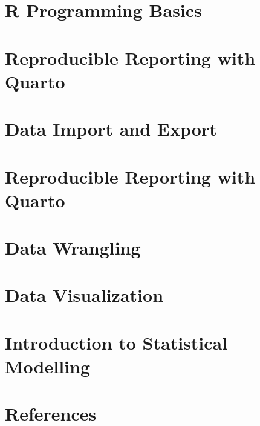 \documentclass[
  letterpaper,
  DIV=11,
  numbers=noendperiod]{scrreprt}
\newlength{\cslhangindent}
\newenvironment{CSLReferences}[2] %
 {\begin{list}{}{%
  \setlength{\itemindent}{0pt}
  \setlength{\leftmargin}{0pt}
  \setlength{\parsep}{0pt}
  \ifodd #1
   \setlength{\leftmargin}{\cslhangindent}
   \setlength{\itemindent}{-1\cslhangindent}
  \fi
  \setlength{\itemsep}{#2\baselineskip}}}
 {\end{list}}
\begin{document}

\chapter{R Programming Basics}\label{r-programming-basics}


\chapter{Reproducible Reporting with
Quarto}\label{reproducible-reporting-with-quarto}


\chapter{Data Import and Export}\label{data-import-and-export}


\chapter{Reproducible Reporting with
Quarto}\label{reproducible-reporting-with-quarto-1}


\chapter{Data Wrangling}\label{data-wrangling}


\chapter{Data Visualization}\label{data-visualization}


\chapter{Introduction to Statistical
Modelling}\label{introduction-to-statistical-modelling}


\chapter*{References}\label{references}


\label{refs}
\begin{CSLReferences}{0}{1}
\end{CSLReferences}
\end{document}
